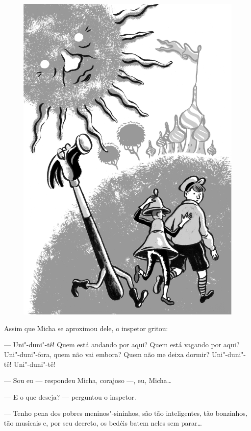\begin{figure}%
\vspace*{-2.5cm}
\hspace*{-2.2cm}\includegraphics{./imgs/cena2.jpg}
\end{figure}

Assim que Micha se aproximou dele, o inspetor gritou:

--- Uni"-duni"-tê! Quem está andando por aqui? Quem está vagando por aqui?
Uni"-duni"-fora, quem não vai embora? Quem não me deixa dormir?
Uni"-duni"-tê! Uni"-duni"-tê!

--- Sou eu --- respondeu Micha, corajoso ---, eu, Micha\ldots{}

--- E o que deseja? --- perguntou o inspetor.

--- Tenho pena dos pobres meninos"-sininhos, são tão inteligentes, tão
bonzinhos, tão musicais e, por seu decreto, os bedéis batem neles sem
parar\ldots{}

